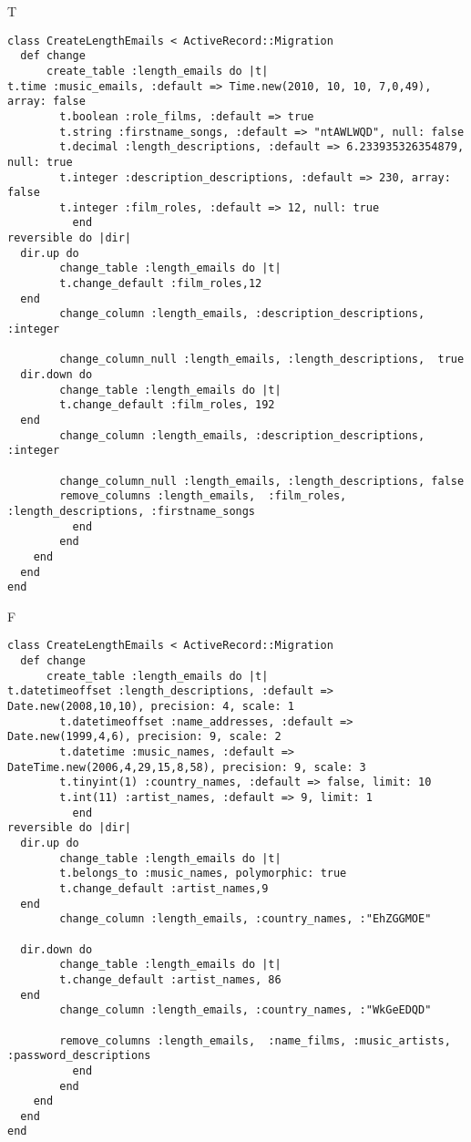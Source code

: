 T
\begin{verbatim}
class CreateLengthEmails < ActiveRecord::Migration
  def change
	  create_table :length_emails do |t|
t.time :music_emails, :default => Time.new(2010, 10, 10, 7,0,49), array: false
		t.boolean :role_films, :default => true
		t.string :firstname_songs, :default => "ntAWLWQD", null: false
		t.decimal :length_descriptions, :default => 6.233935326354879, null: true
		t.integer :description_descriptions, :default => 230, array: false
		t.integer :film_roles, :default => 12, null: true
		  end
reversible do |dir|
  dir.up do
		change_table :length_emails do |t|
		t.change_default :film_roles,12
  end
 		change_column :length_emails, :description_descriptions, :integer
   
		change_column_null :length_emails, :length_descriptions,  true
  dir.down do
		change_table :length_emails do |t|
		t.change_default :film_roles, 192
  end
 		change_column :length_emails, :description_descriptions, :integer
   
		change_column_null :length_emails, :length_descriptions, false
 		remove_columns :length_emails,  :film_roles, :length_descriptions, :firstname_songs 
	      end
	    end
    end 
  end
end

\end{verbatim}

F
\begin{verbatim}
class CreateLengthEmails < ActiveRecord::Migration
  def change
	  create_table :length_emails do |t|
t.datetimeoffset :length_descriptions, :default => Date.new(2008,10,10), precision: 4, scale: 1
		t.datetimeoffset :name_addresses, :default => Date.new(1999,4,6), precision: 9, scale: 2
		t.datetime :music_names, :default => DateTime.new(2006,4,29,15,8,58), precision: 9, scale: 3
		t.tinyint(1) :country_names, :default => false, limit: 10
		t.int(11) :artist_names, :default => 9, limit: 1
		  end
reversible do |dir|
  dir.up do
		change_table :length_emails do |t|
		t.belongs_to :music_names, polymorphic: true
 		t.change_default :artist_names,9
  end
 		change_column :length_emails, :country_names, :"EhZGGMOE"
   
  dir.down do
		change_table :length_emails do |t|
		t.change_default :artist_names, 86
  end
 		change_column :length_emails, :country_names, :"WkGeEDQD"
   
		remove_columns :length_emails,  :name_films, :music_artists, :password_descriptions 
	      end
	    end
    end 
  end
end

\end{verbatim}

